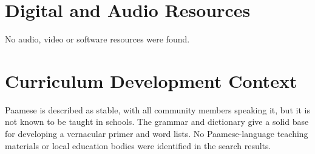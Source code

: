 \documentclass[12pt]{article}
\begin{document}
\section{Digital and Audio Resources}
No audio, video or software resources were found.

\section{Curriculum Development Context}
Paamese is described as stable, with all community members speaking it, but it is not known to be taught in schools. The grammar and dictionary give a solid base for developing a vernacular primer and word lists. No Paamese-language teaching materials or local education bodies were identified in the search results.
\end{document}
